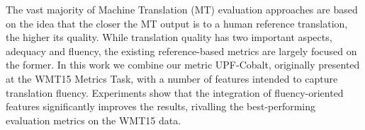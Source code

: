The vast majority of Machine Translation (MT) evaluation approaches are based on the idea that the closer the MT output is to a human reference translation, the higher its quality. While translation quality has two important aspects, adequacy and fluency, the existing reference-based metrics are largely focused on the former. In this work we combine our metric UPF-Cobalt, originally presented at the WMT15 Metrics Task, with a number of features intended to capture translation fluency. Experiments show that the integration of fluency-oriented features significantly improves the results, rivalling the best-performing evaluation metrics on the WMT15  data.
